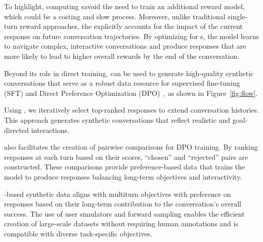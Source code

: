  To highlight, computing \ourst savoid the need to train an additional reward model, which could be a costing and slow process. Moreover, unlike traditional single-turn reward approaches, the \ours explicitly accounts for the impact of the current response on future conversation trajectories. By optimizing for \ourst s, the model learns to navigate complex, interactive conversations and produce responses that are more likely to lead to higher overall rewards by the end of the conversation.


Beyond its role in direct training, \ours can be used to generate high-quality synthetic conversations that serve as a robust data resource for supervised fine-tuning (SFT) and Direct Preference Optimization (DPO)~\citep{dpo}, as shown in Figure~\ref{fig:flow}. 

 Using \ourst, we iteratively select top-ranked responses to extend conversation histories. This approach generates synthetic conversations that reflect realistic and goal-directed interactions.

 \ours also facilitates the creation of pairwise comparisons for DPO training. By ranking responses at each turn based on their \ours scores, ``chosen'' and ``rejected'' pairs are constructed. These comparisons provide preference-based data that trains the model to produce responses balancing long-term objectives and interactivity.

\ourst-based synthetic data aligns with multiturn objectives with preference on responses based on their long-term contribution to the conversation's overall success. The use of user simulators and forward sampling enables the efficient creation of large-scale datasets without requiring human annotations and is compatible with diverse task-specific objectives.


